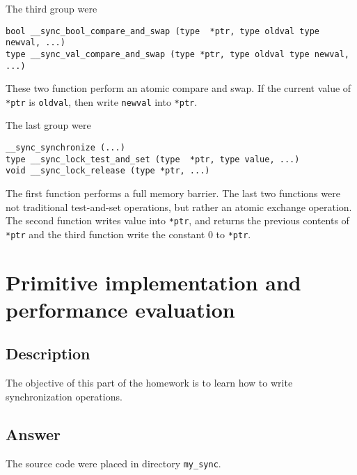 \documentclass[12pt]{article}
\begin{document}
The third group were
\begin{verbatim}
bool __sync_bool_compare_and_swap (type  *ptr, type oldval type newval, ...)
type __sync_val_compare_and_swap (type *ptr, type oldval type newval, ...)
\end{verbatim}
These two function perform an atomic compare and swap. If the current value of 
\texttt{*ptr} is \texttt{oldval}, then write \texttt{newval} into \texttt{*ptr}.

The last group were
\begin{verbatim}
__sync_synchronize (...)
type __sync_lock_test_and_set (type  *ptr, type value, ...)
void __sync_lock_release (type *ptr, ...)
\end{verbatim}
The first function performs a full memory barrier. The last two functions were 
not traditional test-and-set operations, but rather an atomic exchange operation. 
The second function writes value into \texttt{*ptr}, and returns the previous 
contents of \texttt{*ptr} and the third function write the constant 0 to 
\texttt{*ptr}.

\section{Primitive implementation and performance evaluation}
\subsection{Description}
The objective of this part of the homework is to learn how to write 
synchronization operations.

\subsection{Answer}
The source code were placed in directory \texttt{my\_sync}.
\end{document}
